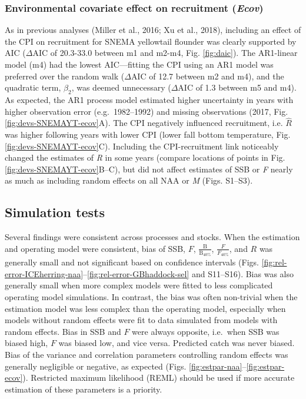 \documentclass[]{article}
\begin{document}
\hypertarget{environmental-covariate-effect-on-recruitment-ecov}{%
\subsubsection{\texorpdfstring{Environmental covariate effect on
recruitment
(\emph{Ecov})}{Environmental covariate effect on recruitment (Ecov)}}\label{environmental-covariate-effect-on-recruitment-ecov}}

As in previous analyses (Miller et al., 2016; Xu et al., 2018),
including an effect of the CPI on recruitment for SNEMA yellowtail
flounder was clearly supported by AIC (\(\Delta \text{AIC}\) of
20.3-33.0 between m1 and m2-m4, Fig. \ref{fig:daic}). The AR1-linear
model (m4) had the lowest AIC---fitting the CPI using an AR1 model was
preferred over the random walk (\(\Delta \text{AIC}\) of 12.7 between m2
and m4), and the quadratic term, \(\beta_2\), was deemed unnecessary
(\(\Delta \text{AIC}\) of 1.3 between m5 and m4). As expected, the AR1
process model estimated higher uncertainty in years with higher
observation error (e.g.~1982--1992) and missing observations (2017, Fig.
\ref{fig:devs-SNEMAYT-ecov}A). The CPI negatively influenced
recruitment, i.e. \(\hat{R}\) was higher following years with lower CPI
(lower fall bottom temperature, Fig. \ref{fig:devs-SNEMAYT-ecov}C).
Including the CPI-recruitment link noticeably changed the estimates of
\emph{R} in some years (compare locations of points in Fig.
\ref{fig:devs-SNEMAYT-ecov}B--C), but did not affect estimates of SSB or
\emph{F} nearly as much as including random effects on all NAA or
\emph{M} (Figs. S1--S3).

\hypertarget{simulation-tests-1}{%
\subsection{Simulation tests}\label{simulation-tests-1}}

Several findings were consistent across processes and stocks. When the
estimation and operating model were consistent, bias of SSB, \(F\),
\(\frac{\text{B}}{\text{B}_{40\%}}\), \(\frac{F}{F_{40\%}}\), and \(R\)
was generally small and not significant based on confidence intervals
(Figs.
\ref{fig:rel-error-ICEherring-naa}--\ref{fig:rel-error-GBhaddock-sel}
and S11--S16). Bias was also generally small when more complex models
were fitted to less complicated operating model simulations. In
contrast, the bias was often non-trivial when the estimation model was
less complex than the operating model, especially when models without
random effects were fit to data simulated from models with random
effects. Bias in SSB and \(F\) were always opposite, i.e.~when SSB was
biased high, \(F\) was biased low, and vice versa. Predicted catch was
never biased. Bias of the variance and correlation parameters
controlling random effects was generally negligible or negative, as
expected (Figs. \ref{fig:estpar-naa}--\ref{fig:estpar-ecov}). Restricted
maximum likelihood (REML) should be used if more accurate estimation of
these parameters is a priority.
\end{document}

